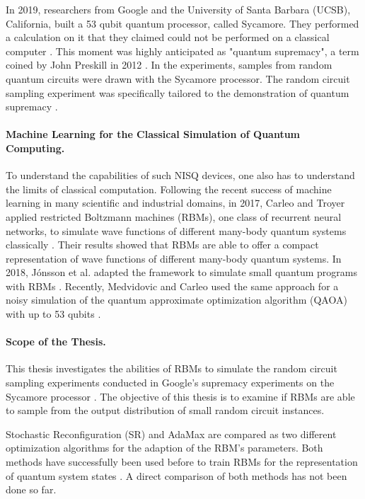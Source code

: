 In 2019, researchers from Google and the University of Santa Barbara (UCSB), California, built a 
53 qubit quantum processor, called Sycamore. They performed a calculation on it that they claimed could not be 
performed on a classical computer \cite{martines2019supremacy}. This moment was highly anticipated 
as "quantum supremacy", a term coined by John Preskill in 2012 \cite{preskill2012quantum}. In the experiments, 
samples from random quantum circuits were drawn with the Sycamore processor.
The random circuit sampling experiment was specifically tailored 
to the demonstration of quantum supremacy \cite{Boixo2018supremacy}.

\paragraph{Machine Learning for the Classical Simulation of Quantum Computing.}
To understand the capabilities of such NISQ devices, one also has to understand 
the limits of classical computation. Following the recent success of machine learning in 
many scientific and industrial domains, in 2017, Carleo and Troyer applied restricted Boltzmann machines (RBMs),
one class of recurrent neural networks,
to simulate wave functions of different many-body quantum systems classically \cite{carleo2017solving}.
Their results showed that RBMs are able to offer a compact representation of wave functions 
of different many-body quantum systems. In 2018, 
J\'{o}nsson et al. adapted the framework to simulate small quantum programs with 
RBMs \cite{jnsson2018neuralnetwork}. Recently, Medvidovic and Carleo used the 
same approach for a noisy simulation of the quantum approximate optimization algorithm 
(QAOA) with up to 53 qubits \cite{medvidovic2020classical}.

\paragraph{Scope of the Thesis.}
This thesis investigates the abilities of RBMs to simulate the random circuit sampling 
experiments conducted in Google's supremacy experiments on the Sycamore processor \cite{martines2019supremacy}. 
The objective of this thesis is to examine if RBMs are able to sample from the output distribution 
of small random circuit instances.

Stochastic Reconfiguration (SR) \cite{sorella1998green} and 
AdaMax \cite{kingma2014adam} are compared as two different optimization algorithms for the 
adaption of the RBM's parameters. Both methods have successfully been used before to train RBMs 
for the representation of quantum system states \cite{jnsson2018neuralnetwork,carleo2017solving,carleo2018constructing,medvidovic2020classical}.
A direct comparison of both methods has not been done so far. 

